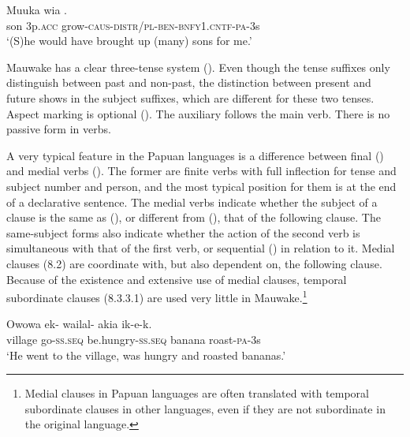 \ea%
\label{ex:x664}
\gll Muuka  wia . \\
 son  3p.\textsc{acc}  grow-\textsc{caus}-\textsc{distr/pl}-\textsc{ben}-\textsc{bnfy1.cntf-pa}-3s     \\
\glt `(S)he would have brought up (many) sons for me.'
\z


Mauwake has a clear three-tense system (). Even though the tense suffixes only distinguish between past and non-past, the distinction between present and future shows in the subject suffixes, which are different for these two tenses.  Aspect marking is optional ().  The auxiliary follows the main verb. There is no passive form in verbs.

A very typical feature in the Papuan languages is a difference between final () and medial verbs (). The former are finite verbs with full inflection for tense and subject number and person, and the most typical position for them is at the end of a declarative sentence. The medial verbs indicate whether the subject of a clause is the same as (), or different from (), that of the following clause. The same-subject forms also indicate whether the action of the second verb is simultaneous with that of the first verb, or sequential () in relation to it. Medial clauses (8.2) are coordinate with, but also dependent on, the following clause. Because of the existence and extensive use of medial clauses, temporal subordinate clauses (8.3.3.1) are used very little in Mauwake.\footnote{Medial clauses in Papuan languages are often translated with temporal subordinate clauses in other languages, even if they are not subordinate in the original language.}

\ea%
\label{ex:x662}
\gll Owowa  ek-  wailal-  akia  ik-e-k. \\
village  go-\textsc{ss.seq} be.hungry-\textsc{ss.seq} banana  roast-\textsc{pa}-3s      \\
\glt `He went to the village, was hungry and roasted bananas.'
\z


